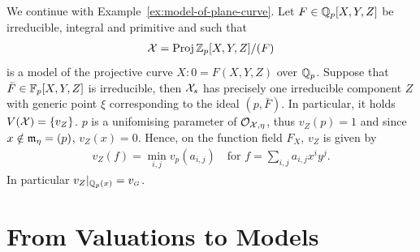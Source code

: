 \begin{example}
    We continue with Example~\ref{ex:model-of-plane-curve}.
    Let $F\in \mathbb Q_p[X,Y,Z]$ be irreducible, integral and primitive and such that
    \begin{align}
        \mathcal X = \operatorname{Proj}{\mathbb Z_p[X,Y,Z]/(F)}
    \end{align}
    is a model of the projective curve $X: 0=F(X,Y,Z)$ over $\mathbb Q_p$.
    Suppose that $\bar{F} \in \mathbb F_p[X,Y,Z]$ is irreducible, then $\mathcal X_s$ has precisely one irreducible component $Z$
    with generic point $\xi$ corresponding to the ideal $(p, \bar{F})$.
    In particular, it holds $V(\mathcal X) = \lbrace v_Z\rbrace$. 
    $p$ is a unifomising parameter of $\mathcal{O}_{\mathcal X, \eta}$, thus $v_Z(p)=1$ and since $x \notin \mathfrak m_\eta=(p)$, $v_Z(x)=0$.
    Hence, on the function field $F_X$, $v_Z$ is given by 
    \begin{align}
        v_Z(f) = \min_{i,j}v_p(a_{i,j}) \quad \text{for } f = \sum_{i,j}a_{i,j}x^i y^j.
    \end{align}
    In particular $v_Z|_{\mathbb Q_p(x)} = v_{\scriptscriptstyle G}$.
\end{example}

\section{From Valuations to Models}\label{sec:from-valuations-to-models}

